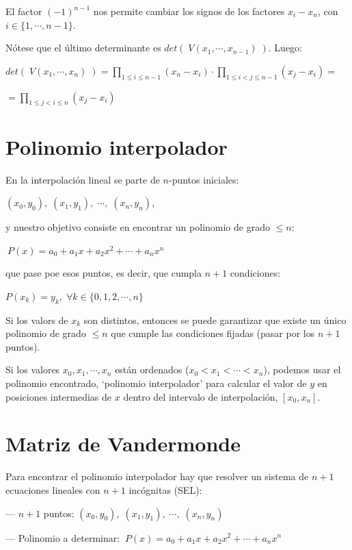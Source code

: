  \noindent El factor $(-1)^{n-1}$ nos permite cambiar los signos de los factores $x_i-x_n$, con $i \in \{1, \cdots, n-1\}$.
 
\noindent  Nótese que el último determinante es  $det(\; V(x_1, \cdots , x_{n-1}) \;)$. Luego:
 
 \noindent $\displaystyle det(\; V(x_1, \cdots , x_{n}) \;)= 
 \prod_{1 \le i \le n-1} (x_n-x_i) \cdot  \prod_{1 \le i < j \le n-1} (x_j-x_i)=$
 
 \noindent $=\displaystyle \prod_{1 \le j < i \le n} (x_j-x_i)$ 
 
 \rightline{$\Box$}




\section{Polinomio interpolador}

En la interpolación lineal se parte de $n$-puntos iniciales: 

\centerline{$(x_0,y_0),\; (x_1,y_1),\; \cdots ,\; (x_n,y_n)$, }

y nuestro objetivo consiste en encontrar un polinomio de grado $\le n$: 

\centerline{$\ P(x)=a_0+a_1x+a_2x^2+ \cdots + a_nx^n$}

que pase poe esos puntos, es decir, que cumpla  $n+1$ condiciones:

\centerline{$P(x_k)=y_k,\; \forall k \in \{0,1,2,\cdots,n\}$}

Si los valors de $x_k$ son distintos, entonces se puede garantizar que existe un único polinomio de grado $\le n$ que cumple las condiciones fijadas (pasar por los $n+1$ puntos).

Si los valores $x_0, x_1, \cdots , x_n$ están ordenados 
($x_0 < x_1 < \cdots < x_n$), podemos usar el polinomio encontrado, `polinomio
interpolador' para calcular el valor de $y$ en posiciones intermedias de $x$ dentro del intervalo de interpolación, $[x_0,x_n]$.


\section{Matriz de Vandermonde}

Para encontrar el polinomio interpolador hay que resolver un sistema de $n+1$ ecuaciones lineales con $n+1$ incógnitas (SEL):

--- $n+1$ puntos: $(x_0,y_0),\; (x_1,y_1),\; \cdots ,\; (x_n,y_n)$

--- Polinomio a determinar: $\ P(x)=a_0+a_1x+a_2x^2+ \cdots + a_nx^n$

